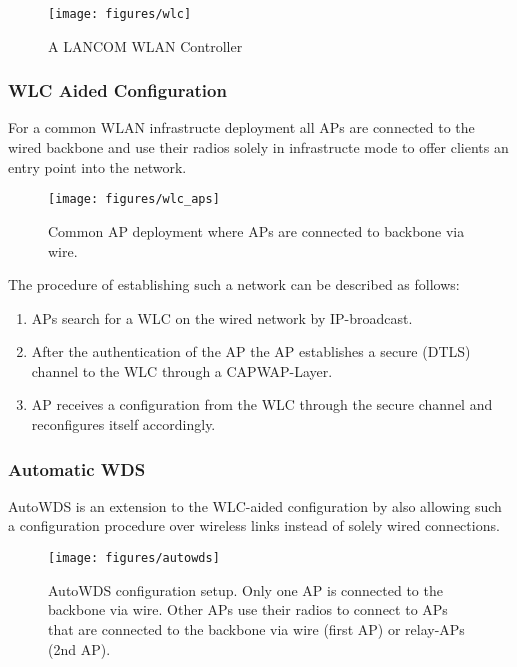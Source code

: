 	\begin{figure}[h!]
	  \centering
	  \texttt{[image: figures/wlc]}
	  \caption{A LANCOM WLAN Controller \cite{lancom}}
	  \label{fig:wlc}
	\end{figure}
	
	\newpage
      
      \subsubsection{WLC Aided Configuration}
	For a common \ac{WLAN} infrastructe deployment all APs are connected to the wired backbone and use their radios solely in infrastructe mode to 
	offer clients an entry point into the network.
	\begin{figure}[h!]
	  \centering
	  \texttt{[image: figures/wlc\_aps]}
	  \caption{Common \ac{AP} deployment where APs are connected to backbone via wire.}
	  \label{fig:wlc_aps}
	\end{figure}
	The procedure of establishing such a network can be described as follows:
	\begin{enumerate}
	 \item APs search for a \ac{WLC} on the wired network by \ac{IP}-broadcast.
	 \item After the authentication of the \ac{AP} the \ac{AP} establishes a secure (\ac{DTLS}) channel to the \ac{WLC} through a \ac{CAPWAP}-Layer.
	 \item \ac{AP} receives a configuration from the \ac{WLC} through the secure channel and reconfigures itself accordingly.
	\end{enumerate}
	
      \subsubsection{Automatic \ac{WDS}}
	\label{autowdsbasic}
	AutoWDS is an extension to the \ac{WLC}-aided configuration by also allowing such a configuration procedure over wireless links instead of solely wired connections.
            
	\begin{figure}[h!]
	  \centering
	  \texttt{[image: figures/autowds]}
	  \caption{AutoWDS configuration setup. Only one AP is connected to the backbone via wire. 
	    Other APs use their radios to connect to APs that are connected to the backbone via wire (first \ac{AP}) or relay-APs (2nd \ac{AP}).}
	  \label{fig:autowds}
	\end{figure}
	
